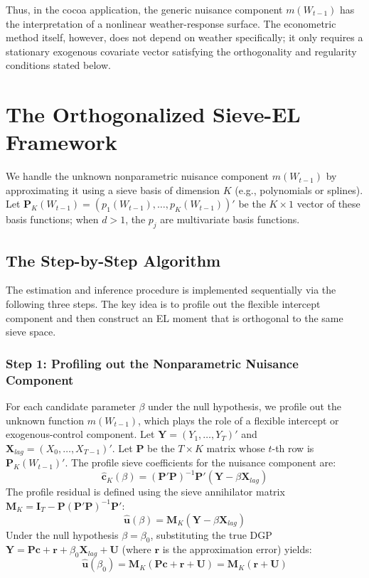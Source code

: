 \documentclass{article}
\begin{document}
Thus, in the cocoa application, the generic nuisance component $m(W_{t-1})$
has the interpretation of a nonlinear weather-response surface. The econometric
method itself, however, does not depend on weather specifically; it only
requires a stationary exogenous covariate vector satisfying the orthogonality
and regularity conditions stated below.

\section{The Orthogonalized Sieve-EL Framework}

We handle the unknown nonparametric nuisance component $m(W_{t-1})$ by approximating it using a sieve basis of dimension $K$ (e.g., polynomials or splines). Let $\bm{P}_K(W_{t-1}) = (p_1(W_{t-1}), \dots, p_K(W_{t-1}))'$ be the $K \times 1$ vector of these basis functions; when $d>1$, the $p_j$ are multivariate basis functions.

\subsection{The Step-by-Step Algorithm}

The estimation and inference procedure is implemented sequentially via the following three steps. The key idea is to profile out the flexible intercept component and then construct an EL moment that is orthogonal to the same sieve space.

\subsubsection*{Step 1: Profiling out the Nonparametric Nuisance Component}
For each candidate parameter $\beta$ under the null hypothesis, we profile out the unknown function $m(W_{t-1})$, which plays the role of a flexible intercept or exogenous-control component. Let $\bm{Y} = (Y_1, \dots, Y_T)'$ and $\bm{X}_{lag} = (X_0, \dots, X_{T-1})'$. Let $\bm{P}$ be the $T \times K$ matrix whose $t$-th row is $\bm{P}_K(W_{t-1})'$. The profile sieve coefficients for the nuisance component are:
\begin{equation}
    \widehat{\bm{c}}_K(\beta) = (\bm{P}'\bm{P})^{-1}\bm{P}'(\bm{Y} - \beta \bm{X}_{lag})
\end{equation}
The profile residual is defined using the sieve annihilator matrix $\bm{M}_K = \bm{I}_T - \bm{P}(\bm{P}'\bm{P})^{-1}\bm{P}'$:
\begin{equation}
    \widehat{\bm{u}}(\beta) = \bm{M}_K(\bm{Y} - \beta \bm{X}_{lag})
\end{equation}
Under the null hypothesis $\beta = \beta_0$, substituting the true DGP $\bm{Y} = \bm{P}\bm{c} + \bm{r} + \beta_0 \bm{X}_{lag} + \bm{U}$ (where $\bm{r}$ is the approximation error) yields:
\begin{equation}
    \widehat{\bm{u}}(\beta_0) = \bm{M}_K(\bm{P}\bm{c} + \bm{r} + \bm{U}) = \bm{M}_K(\bm{r} + \bm{U})
\end{equation}
\end{document}
